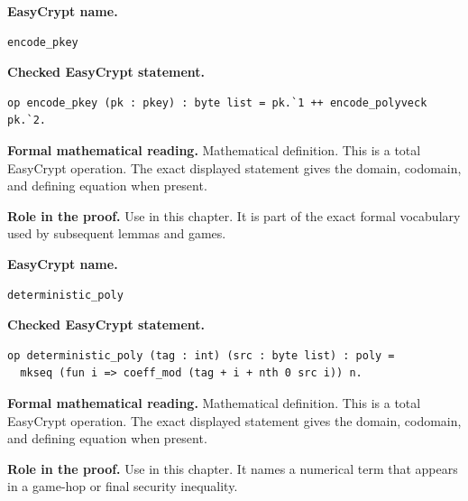 \begin{formaldefinition}
\noindent\textbf{EasyCrypt name.}
\begin{lstlisting}[language=EasyCrypt,basicstyle=\ttfamily\scriptsize]
encode_pkey
\end{lstlisting}
\noindent\textbf{Checked EasyCrypt statement.}
\begin{lstlisting}[language=EasyCrypt,basicstyle=\ttfamily\scriptsize]
op encode_pkey (pk : pkey) : byte list = pk.`1 ++ encode_polyveck pk.`2.
\end{lstlisting}
\noindent\textbf{Formal mathematical reading.}
Mathematical definition. This is a total EasyCrypt operation.  The exact displayed statement gives the domain, codomain, and defining equation when present.

\noindent\textbf{Role in the proof.}
Use in this chapter. It is part of the exact formal vocabulary used by subsequent lemmas and games.

\end{formaldefinition}

\begin{formaldefinition}
\noindent\textbf{EasyCrypt name.}
\begin{lstlisting}[language=EasyCrypt,basicstyle=\ttfamily\scriptsize]
deterministic_poly
\end{lstlisting}
\noindent\textbf{Checked EasyCrypt statement.}
\begin{lstlisting}[language=EasyCrypt,basicstyle=\ttfamily\scriptsize]
op deterministic_poly (tag : int) (src : byte list) : poly =
  mkseq (fun i => coeff_mod (tag + i + nth 0 src i)) n.
\end{lstlisting}
\noindent\textbf{Formal mathematical reading.}
Mathematical definition. This is a total EasyCrypt operation.  The exact displayed statement gives the domain, codomain, and defining equation when present.

\noindent\textbf{Role in the proof.}
Use in this chapter. It names a numerical term that appears in a game-hop or final security inequality.

\end{formaldefinition}

